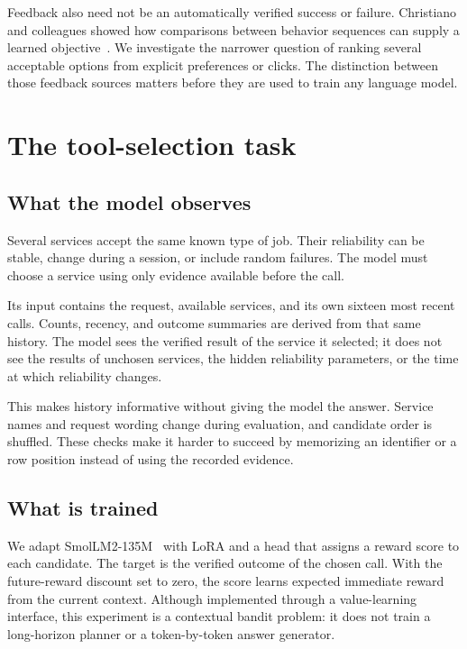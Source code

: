 \documentclass{strategynet-journal}
\begin{document}
\begin{SNcolumns}
Feedback also need not be an automatically verified success or failure.
Christiano and colleagues showed how comparisons between behavior sequences
can supply a learned objective~\cite{preferences}. We investigate the narrower
question of ranking several acceptable options from explicit preferences or
clicks. The distinction between those feedback sources matters before they
are used to train any language model.

\section{The tool-selection task}

\subsection{What the model observes}

Several services accept the same known type of job. Their reliability can be
stable, change during a session, or include random failures. The model must
choose a service using only evidence available before the call.

Its input contains the request, available services, and its own sixteen most
recent calls. Counts, recency, and outcome summaries are derived from that
same history. The model sees the verified result of the service it selected;
it does not see the results of unchosen services, the hidden reliability
parameters, or the time at which reliability changes.

This makes history informative without giving the model the answer. Service
names and request wording change during evaluation, and candidate order is
shuffled. These checks make it harder to succeed by memorizing an identifier
or a row position instead of using the recorded evidence.

\subsection{What is trained}

We adapt SmolLM2-135M~\cite{smollm2} with LoRA and a head that assigns a reward
score to each candidate. The target is the verified outcome of the chosen
call. With the future-reward discount set to zero, the score learns expected
immediate reward from the current context. Although implemented through a
value-learning interface, this experiment is a contextual bandit problem:
it does not train a long-horizon planner or a token-by-token answer generator.


\end{SNcolumns}
\end{document}
